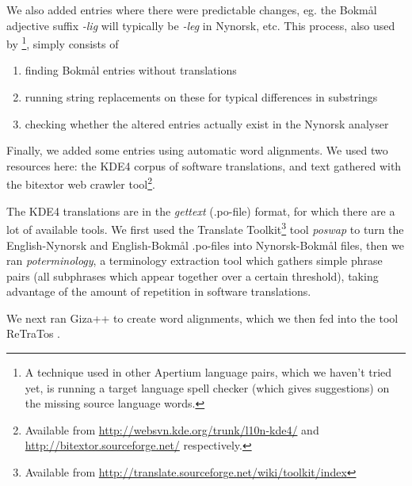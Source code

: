\documentclass[11pt]{article}
\begin{document}
We also added entries where there were predictable changes, eg. the
Bokmål adjective suffix \emph{-lig} will typically be \emph{-leg} in Nynorsk,
etc. This process, also used by \citet[p.~4]{tyers2009dpm}\footnote{A technique used in other Apertium language pairs, which we
haven't tried yet, is running a target language spell checker (which
gives suggestions) on the missing source language words. },
simply consists of
\begin{enumerate}
\item finding Bokmål entries without translations
\item running string replacements on these for typical differences in
   substrings
\item checking whether the altered entries actually exist in the Nynorsk
   analyser
\end{enumerate}
Finally, we added some entries using automatic word alignments. We
used two resources here: the KDE4 corpus of software translations, and
text gathered with the bitextor web crawler tool\footnote{Available from \href{http://websvn.kde.org/trunk/l10n-kde4/}{http://websvn.kde.org/trunk/l10n-kde4/} and
\href{http://bitextor.sourceforge.net/}{http://bitextor.sourceforge.net/} respectively. }. 

The KDE4 translations are in the \emph{gettext} (.po-file) format, for
which there are a lot of available tools. We first used the Translate
Toolkit\footnote{Available from
\href{http://translate.sourceforge.net/wiki/toolkit/index}{http://translate.sourceforge.net/wiki/toolkit/index} } tool \emph{poswap} to turn the English-Nynorsk and
English-Bokmål .po-files into Nynorsk-Bokmål files, then we ran
\emph{poterminology}, a terminology extraction tool which gathers simple
phrase pairs (all subphrases which appear together over a certain
threshold), taking advantage of the amount of repetition in software
translations. 

We next ran Giza++ \citep{och2003scv} to create word alignments, which
we then fed into the tool ReTraTos \citep{caseli2006aib}.
\end{document}

